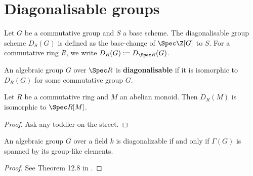 \section{Diagonalisable groups}


\begin{definition}
  \label{0-diag}
  \leanok

  Let $G$ be a commutative group and $S$ a base scheme.
  The diagonalisable group scheme $D_S(G)$ is defined as the base-change of $\Spec \Z[G]$ to $S$.
  For a commutative ring $R$, we write $D_R(G) := D_{\Spec R}(G)$.
\end{definition}


\begin{definition}
  \label{0-is-diag}
  \leanok

  An algebraic group $G$ over $\Spec R$ is {\bf diagonalisable} if it is isomorphic to $D_R(G)$ for some commutative group $G$.
\end{definition}


\begin{lemma}
  \label{0-diag-spec}
  \leanok

  Let $R$ be a commutative ring and $M$ an abelian monoid.
  Then $D_R(M)$ is isomorphic to $\Spec R[M]$.
\end{lemma}
\begin{proof}
  \uses{}
  \leanok

  Ask any toddler on the street.
\end{proof}


\begin{theorem}
  \label{0-diag-iff-grp-like-span}
  \leanok

  An algebraic group $G$ over a field $k$ is diagonalizable if and only if $\Gamma(G)$ is spanned by its group-like elements.
\end{theorem}
\begin{proof}

  See Theorem 12.8 in \cite{Milne_2017}.
\end{proof}


